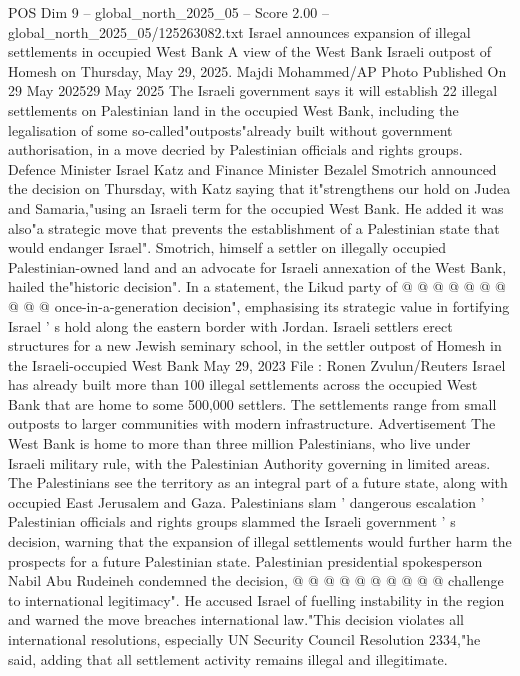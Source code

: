 \begin{textsample}{POS Dim 9 – global\_north\_2025\_05 – Score 2.00 – global\_north\_2025\_05/125263082.txt}  \label{ex:f9_pos_266}
Israel announces expansion of illegal settlements in occupied West Bank A view of the West Bank Israeli outpost of Homesh on Thursday, May 29, 2025.
Majdi Mohammed/AP Photo Published On 29 May 202529 May 2025 The Israeli government says it will establish 22 illegal settlements on Palestinian land in the occupied West Bank, including the legalisation of some so-called"outposts"already built without government authorisation, in a move decried by Palestinian officials and rights groups.
Defence Minister Israel Katz and Finance Minister Bezalel Smotrich announced the decision on Thursday, with Katz saying that it"strengthens our hold on Judea and Samaria,"using an Israeli term for the occupied West Bank.
He added it was also"a strategic move that prevents the establishment of a Palestinian state that would endanger Israel".
Smotrich, himself a settler on illegally occupied Palestinian-owned land and an advocate for Israeli annexation of the West Bank, hailed the"historic decision".
In a statement, the Likud party of @ @ @ @ @ @ @ @ @ @ once-in-a-generation decision", emphasising its strategic value in fortifying Israel ' s hold along the eastern border with Jordan.
Israeli settlers erect structures for a new Jewish seminary school, in the settler outpost of Homesh in the Israeli-occupied West Bank May 29, 2023 File : Ronen Zvulun/Reuters Israel has already built more than 100 illegal settlements across the occupied West Bank that are home to some 500,000 settlers.
The settlements range from small outposts to larger communities with modern infrastructure.
Advertisement The West Bank is home to more than three million Palestinians, who live under Israeli military rule, with the Palestinian Authority governing in limited areas.
The Palestinians see the territory as an integral part of a future state, along with occupied East Jerusalem and Gaza.
Palestinians slam ' dangerous escalation ' Palestinian officials and rights groups slammed the Israeli government ' s decision, warning that the expansion of illegal settlements would further harm the prospects for a future Palestinian state.
Palestinian presidential spokesperson Nabil Abu Rudeineh condemned the decision, @ @ @ @ @ @ @ @ @ @ challenge to international legitimacy".
He accused Israel of fuelling instability in the region and warned the move breaches international law."This decision violates all international resolutions, especially UN Security Council Resolution 2334,"he said, adding that all settlement activity remains illegal and illegitimate.

\end{textsample}
